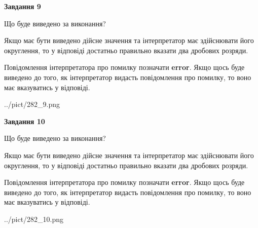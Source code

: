 \documentclass[12pt, ukrainian]{article}
\begin{document}
{\begin {Large}
{\begin {center}\textbf{Завдання 9}\end {center}}\par
Що буде виведено за виконання? \par

Якщо має бути виведено дійсне значення та інтерпретатор має здійснювати його округлення, 
то у відповіді достатньо правильно вказати два дробових розряди.

Повідомлення інтерпретатора про помилку позначати \textbf{error}.
Якщо щось буде виведено до того, як інтерпретатор видасть повідомлення про помилку, 
то воно має вказуватись у відповіді. \par

\begin{center}
	{../pict/282_9.png}
\end{center}
\newpage

{\begin {center}\textbf{Завдання 10}\end {center}}\par
Що буде виведено за виконання? \par

Якщо має бути виведено дійсне значення та інтерпретатор має здійснювати його округлення, 
то у відповіді достатньо правильно вказати два дробових розряди.

Повідомлення інтерпретатора про помилку позначати \textbf{error}.
Якщо щось буде виведено до того, як інтерпретатор видасть повідомлення про помилку, 
то воно має вказуватись у відповіді. \par

\begin{center}
	{../pict/282_10.png}
\end{center}
\newpage

\end {Large}}
\end{document}
